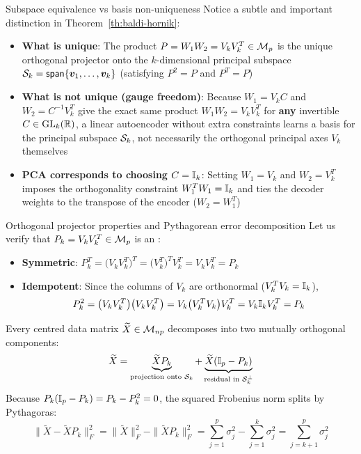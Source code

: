 \documentclass[aspectratio=169]{beamer}\usepackage[]{graphicx}\usepackage[]{xcolor}
\begin{document}
\begin{frame}{Subspace equivalence vs basis non-uniqueness}
Notice a subtle and important distinction in Theorem~\ref{th:baldi-hornik}:
\vfill
\begin{itemize}
\item \textbf{What is unique}: The product $P = W_1 W_2 = V_k V_k^T \in \M_p$ is the unique orthogonal projector onto the $k$-dimensional principal subspace $\S_k = \Span\{\bv_1, \ldots, \bv_k\}$ (satisfying $P^2 = P$ and $P^T = P$)
\vfill
\item \textbf{What is not unique (gauge freedom)}: Because $W_1 = V_k C$ and $W_2 = C^{-1} V_k^T$ give the exact same product $W_1 W_2 = V_k V_k^T$ for \textbf{any} invertible $C \in \GL_k(\IR)$, a linear autoencoder without extra constraints learns a basis for the principal subspace $\S_k$, not necessarily the orthogonal principal axes $V_k$ themselves
\vfill
\item \textbf{PCA corresponds to choosing $C = \II_k$}: Setting $W_1 = V_k$ and $W_2 = V_k^T$ imposes the orthogonality constraint $W_1^T W_1 = \II_k$ and ties the decoder weights to the transpose of the encoder ($W_2 = W_1^T$)
\end{itemize}
\end{frame}


\begin{frame}{Orthogonal projector properties and Pythagorean error decomposition}
Let us verify that $P_k = V_k V_k^T \in \M_p$ is an :
\begin{itemize}
\item \textbf{Symmetric}: $P_k^T = \big(V_k V_k^T\big)^T = \big(V_k^T\big)^T V_k^T = V_k V_k^T = P_k$
\item \textbf{Idempotent}: Since the columns of $V_k$ are orthonormal ($V_k^T V_k = \II_k$),
\[
P_k^2 = \big(V_k V_k^T\big)\big(V_k V_k^T\big) = V_k \big(V_k^T V_k\big) V_k^T = V_k \II_k V_k^T = P_k
\]
\end{itemize}
\vfill
Every centred data matrix $\widetilde{X} \in \M_{np}$ decomposes into two mutually orthogonal components:
\[
\widetilde{X} = \underbrace{\widetilde{X} P_k}_{\text{projection onto } \S_k} + \underbrace{\widetilde{X} (\II_p - P_k)}_{\text{residual in } \S_k^\perp}
\]
Because $P_k(\II_p - P_k) = P_k - P_k^2 = 0$, the squared Frobenius norm splits by Pythagoras:
\[
\|\widetilde{X} - \widetilde{X} P_k\|_F^2 = \|\widetilde{X}\|_F^2 - \|\widetilde{X} P_k\|_F^2 = \sum_{j=1}^p \sigma_j^2 - \sum_{j=1}^k \sigma_j^2 = \sum_{j=k+1}^p \sigma_j^2
\]
\end{frame}
\end{document}
